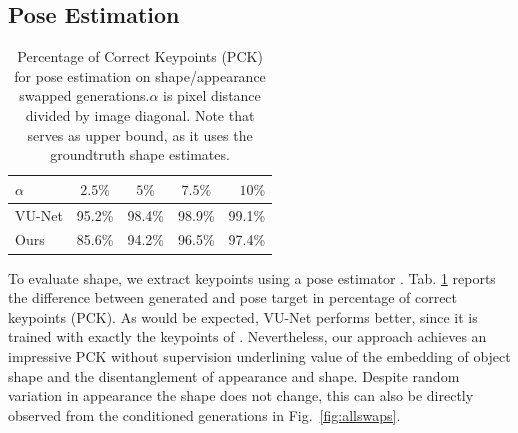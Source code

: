 		\subsection{Pose Estimation}

		\begin{table}[htp]
			\centering
			\caption{Percentage of Correct Keypoints (PCK) for pose estimation on shape/appearance swapped generations.\;$\alpha$ is pixel distance divided by image diagonal. Note that \cite{esser18} serves as upper bound, as it uses the groundtruth shape estimates.}
			\label{tab:pose}
			\begin{tabular}{l|cccr}
				\hline
				$\alpha$ & $2.5\%$ &  $5\%$ & $7.5\%$ & $10\%$ \\ \hline
				VU-Net \cite{esser18} & {95.2}\% & {98.4}\% & {98.9}\% & {99.1}\% \\
				Ours & 85.6\% & 94.2\% &96.5\% & 97.4\% \\ \hline
			\end{tabular}
		\end{table}


		To evaluate shape, we extract keypoints using a pose estimator \cite{cao17affinityfield}. Tab. \ref{tab:pose} reports the difference between generated and pose target in percentage of correct keypoints (PCK).
		As would be expected, VU-Net performs better, since it is trained with exactly the keypoints of \cite{cao17affinityfield}. Nevertheless, our approach achieves an impressive PCK without supervision underlining value of the embedding of object shape and the disentanglement of appearance and shape. Despite random variation in appearance the shape does not change, this can also be directly observed from the conditioned generations in Fig.~\ref{fig:allswaps}.




